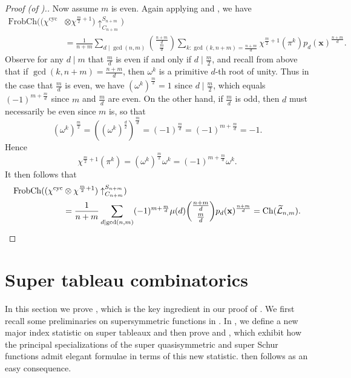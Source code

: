 \documentclass[11pt]{article}
\theoremstyle{definition}
\numberwithin{equation}{section}
\newcommand\xb{\mathbf{x}}
\newcommand\Ltil{\widetilde{\mathcal{L}}}
\newcommand\Ch{\mathrm{Ch}}
\newcommand\FrobCh{\mathrm{FrobCh}}
\begin{document}
\begin{proof}[Proof (of ).]
Now assume $m$ is even. Again applying  and , we have
\begin{align*}
\FrobCh((\chi^\mathrm{cyc} &\otimes \chi^{\frac{m}{2}+1})\uparrow_{C_{n+m}}^{S_{n+m}}) \\
&= \frac{1}{n+m} \sum_{d \mid \gcd(n,m)} \binom{\frac{n+m}{d}}{\frac{m}{d}} \sum_{k : \gcd(k,n+m) = \frac{n+m}{d}} \chi^{\frac{m}{2}+1}(\pi^k) p_d(\mathbf{x})^{\frac{n+m}{d}}.
\end{align*}
Observe for any $d \mid m$ that $\frac{m}{d}$ is even if and only if $d \mid \frac{m}{2}$, and recall from above that if $\gcd(k,n+m) = \frac{n+m}{d}$, then $\omega^k$ is a primitive $d$-th root of unity. Thus in the case that $\frac{m}{d}$ is even, we have $(\omega^k)^{\frac{m}{2}} = 1$ since $d \mid \frac{m}{2}$, which equals $(-1)^{m+\frac{m}{d}}$ since $m$ and $\frac{m}{d}$ are even. On the other hand, if $\frac{m}{d}$ is odd, then $d$ must necessarily be even since $m$ is, so that
\[
(\omega^k)^{\frac{m}{2}} = ((\omega^k)^{\frac{d}{2}})^{\frac{m}{d}} = (-1)^{\frac{m}{d}} = (-1)^{m + \frac{m}{d}} = -1.
\]
Hence
\[
\chi^{\frac{m}{2}+1}(\pi^k) = (\omega^k)^{\frac{m}{2}}\omega^k = (-1)^{m+\frac{m}{d}}\omega^k.
\]
It then follows that
\begin{align*}
\FrobCh((\chi^\mathrm{cyc} &\otimes \chi^{\frac{m}{2}+1})\uparrow_{C_{n+m}}^{S_{n+m}}) \\
&= \frac{1}{n+m} \sum_{d \mid \gcd(n,m)} (-1)^{m + \frac{m}{d}} \mu(d) \binom{\frac{n+m}{d}}{\frac{m}{d}} p_d(\xb)^\frac{n+m}{d} = \Ch(\Ltil_{n,m}). \qedhere
\end{align*}
\end{proof}

\section{Super tableau combinatorics}\label{sec:super-tab}
In this section we prove , which is the key ingredient in our proof of . We first recall some preliminaries on supersymmetric functions in . In , we define a new major index statistic on super tableaux and then prove  and , which exhibit how the principal specializations of the super quasisymmetric and super Schur functions admit elegant formulae in terms of this new statistic.  then follows as an easy consequence.
\end{document}
